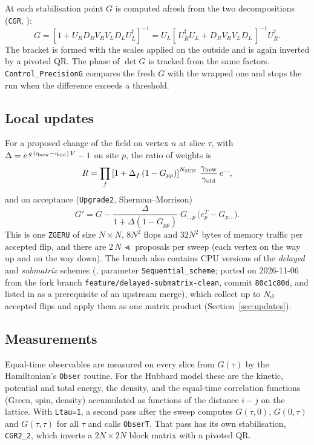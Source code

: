 At each stabilisation point $G$ is computed afresh from the two decompositions (\texttt{CGR}, ):
\begin{equation}
\label{eq:cgr}
G = \left[1 + U_R D_R V_R V_L D_L U_L^\dagger\right]^{-1}
  = U_L\left[\,U_R^\dagger U_L + D_R V_R V_L D_L\,\right]^{-1} U_R^\dagger .
\end{equation}
The bracket is formed with the scales applied on the outside and is again inverted by a pivoted QR. The phase of $\det G$ is tracked from the same factors. \texttt{Control\_PrecisionG} compares the fresh $G$ with the wrapped one and stops the run when the difference exceeds a threshold.

\subsection{Local updates}

For a proposed change of the field on vertex $n$ at slice $\tau$, with $\Delta = e^{\,g\,(\eta_{\rm new}-\eta_{\rm old})\,V}-1$ on site $p$, the ratio of weights is
\begin{equation}
R = \prod_f\left[1+\Delta_f\,(1-G_{pp})\right]^{N_{\rm SUN}}\,\frac{\gamma_{\rm new}}{\gamma_{\rm old}}\,e^{\ldots},
\end{equation}
and on acceptance (\texttt{Upgrade2}, Sherman--Morrison)
\begin{equation}
\label{eq:rank1}
G' = G - \frac{\Delta}{1+\Delta(1-G_{pp})}\;G_{:,p}\,\bigl(e_p^T - G_{p,:}\bigr).
\end{equation}
This is one \texttt{ZGERU} of size $N\times N$, $8N^2$ flops and $32N^2$ bytes of memory traffic per accepted flip, and there are $2\,N\,\Lt$ proposals per sweep (each vertex on the way up and on the way down). The branch also contains CPU versions of the \emph{delayed} and \emph{submatrix} schemes (, parameter \texttt{Sequential\_scheme}; ported on 2026-11-06 from the fork branch \texttt{feature/delayed-submatrix-clean}, commit \texttt{80c1c80d}, and listed in  as a prerequisite of an upstream merge), which collect up to $N_{\rm d}$ accepted flips and apply them as one matrix product (Section~\ref{sec:updates}).

\subsection{Measurements}

Equal-time observables are measured on every slice from $G(\tau)$ by the Hamiltonian's \texttt{Obser} routine. For the Hubbard model these are the kinetic, potential and total energy, the density, and the equal-time correlation functions (Green, spin, density) accumulated as functions of the distance $i-j$ on the lattice. With \texttt{Ltau=1}, a second pass after the sweep computes $G(\tau,0)$, $G(0,\tau)$ and $G(\tau,\tau)$ for all $\tau$ and calls \texttt{ObserT}. That pass has its own stabilisation, \texttt{CGR2\_2}, which inverts a $2N\times 2N$ block matrix with a pivoted QR.

